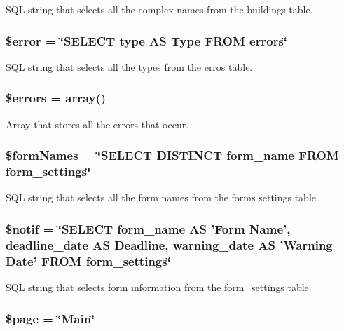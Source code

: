 \-S\-Q\-L string that selects all the complex names from the buildings table. \hypertarget{settings_8php_aeba2ab722cedda53dbb7ec1a59f45550}{
\subsubsection[{\$error}]{\setlength{\rightskip}{0pt plus 5cm}\$error = \char`\"{}\-S\-E\-L\-E\-C\-T type \-A\-S \-Type \-F\-R\-O\-M errors\char`\"{}}}\label{settings_8php_aeba2ab722cedda53dbb7ec1a59f45550}
\-S\-Q\-L string that selects all the types from the erros table. \hypertarget{settings_8php_ab24faf4aa647cdcee494fc48524ad4ff}{
\subsubsection[{\$errors}]{\setlength{\rightskip}{0pt plus 5cm}\$errors = array()}}\label{settings_8php_ab24faf4aa647cdcee494fc48524ad4ff}
\-Array that stores all the errors that occur. \hypertarget{settings_8php_aeeee3257142a61e1147e755245933bc2}{
\subsubsection[{\$form\-Names}]{\setlength{\rightskip}{0pt plus 5cm}\$form\-Names = \char`\"{}\-S\-E\-L\-E\-C\-T \-D\-I\-S\-T\-I\-N\-C\-T form\-\_\-name \-F\-R\-O\-M form\-\_\-settings\char`\"{}}}\label{settings_8php_aeeee3257142a61e1147e755245933bc2}
\-S\-Q\-L string that selects all the form names from the forms settings table. \hypertarget{settings_8php_a088b05600068f1f98fec9e435a59fa4a}{
\subsubsection[{\$notif}]{\setlength{\rightskip}{0pt plus 5cm}\$notif = \char`\"{}\-S\-E\-L\-E\-C\-T form\-\_\-name \-A\-S '\-Form \-Name', deadline\-\_\-date \-A\-S \-Deadline, warning\-\_\-date \-A\-S '\-Warning \-Date' \-F\-R\-O\-M form\-\_\-settings\char`\"{}}}\label{settings_8php_a088b05600068f1f98fec9e435a59fa4a}
\-S\-Q\-L string that selects form information from the form\-\_\-settings table. \hypertarget{settings_8php_a0a44e6760141442bb439b1ab1395d8ff}{
\subsubsection[{\$page}]{\setlength{\rightskip}{0pt plus 5cm}\$page = \char`\"{}\-Main\char`\"{}}}\label{settings_8php_a0a44e6760141442bb439b1ab1395d8ff}
